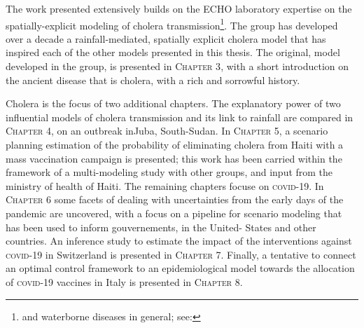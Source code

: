 The work presented extensively builds on the ECHO laboratory expertise on the spatially-explicit modeling of cholera transmission\footnote{and waterborne diseases in general; see: }. The group has developed over a decade a rainfall-mediated, spatially explicit cholera model that has inspired each of the other models presented in this thesis. The original,  model developed in the group, is presented in \textsc{Chapter 3}, with a short introduction on the ancient disease that is cholera, with a rich and sorrowful history.

Cholera is the focus of two additional chapters. The explanatory power of two influential models of cholera transmission and its link to rainfall are compared in \textsc{Chapter 4}, on an outbreak inJuba, South-Sudan. In \textsc{Chapter 5}, a scenario planning estimation of the probability of eliminating cholera from Haiti with a mass vaccination campaign is presented; this work has been carried within the framework of a multi-modeling study with other groups, and input from the ministry of health of Haiti.
The remaining chapters focuse on \textsc{covid}-19. In \textsc{Chapter 6} some facets of dealing with uncertainties from the early days of the pandemic are uncovered, with a focus on a pipeline for scenario modeling that has been used to inform gouvernements, in the United- States and other countries. 
An inference study to estimate the impact of the interventions against \textsc{covid}-19 in Switzerland is presented in \textsc{Chapter 7}.
Finally, a tentative to connect an optimal control framework to an epidemiological model towards the allocation of \textsc{covid}-19 vaccines in Italy is presented in \textsc{Chapter 8}.

